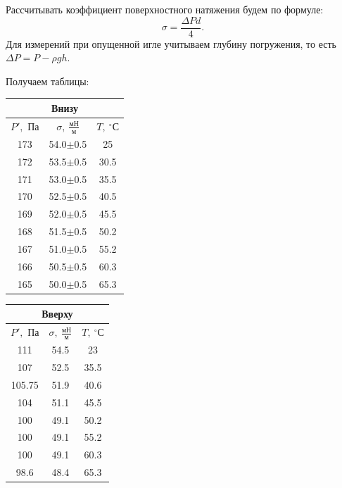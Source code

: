 \documentclass[a4paper,12pt]{article}
\theoremstyle{definition}
\begin{document}
	Рассчитывать коэффициент поверхностного натяжения будем по формуле:
	\begin{equation*}
		\sigma = \frac{\Delta P d}{4}.
	\end{equation*}
	Для измерений при опущенной игле учитываем глубину погружения, то есть $\Delta P = P - \rho g h.$
	
	Получаем таблицы:
		\begin{table}[H]
			\bgroup
			\def\arraystretch{1.2}%
			\begin{minipage}{0.49\linewidth}
			
			\centering
			\begin{tabular}{|c|c|c|}
				\hline
				\multicolumn{3}{|c|}{Внизу}\\
				\hline
				$P',$ Па&$\sigma,\: \frac{\text{мН}}{\text{м}}$& $T,\: ^\circ$С  \\
				\hline
				173 & 54.0$\pm$0.5 & 25 \\ \hline
				172 & 53.5$\pm$0.5 & 30.5 \\ \hline
				171 & 53.0$\pm$0.5 & 35.5 \\ \hline
				170 & 52.5$\pm$0.5 & 40.5 \\ \hline
				169 & 52.0$\pm$0.5 & 45.5 \\ \hline
				168 & 51.5$\pm$0.5 & 50.2 \\ \hline
				167 & 51.0$\pm$0.5 & 55.2 \\ \hline
				166 & 50.5$\pm$0.5 & 60.3 \\ \hline
				165 & 50.0$\pm$0.5 & 65.3 \\ \hline
			\end{tabular}
			\end{minipage}
			\begin{minipage}{0.49\linewidth}
				\centering
					\begin{tabular}{|c|c|c|}
						\hline
						\multicolumn{3}{|c|}{Вверху}\\
						\hline
						
						$P',$ Па&$\sigma,\: \frac{\text{мН}}{\text{м}}$& $T,\: ^\circ$С  \\
						\hline
						111 & 54.5 & 23 \\ \hline
						107 & 52.5 & 35.5 \\ \hline
						105.75 & 51.9 & 40.6 \\ \hline
						104 & 51.1 & 45.5 \\ \hline
						100 & 49.1 & 50.2 \\ \hline
						100 & 49.1 & 55.2 \\ \hline
						100 & 49.1 & 60.3 \\ \hline
						98.6 & 48.4 & 65.3 \\ \hline
					\end{tabular}

			\end{minipage}
			\egroup
		\end{table}
\end{document}
